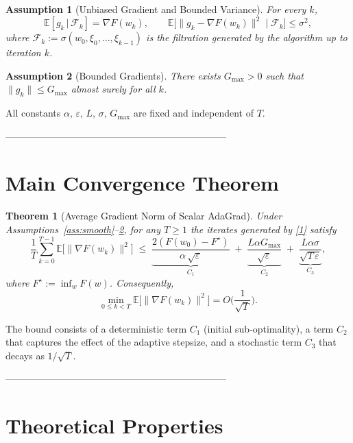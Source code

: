 \documentclass{article}
\newtheorem{theorem}{Theorem}
\newtheorem{assumption}{Assumption}
\newcommand{\E}{\mathbb{E}}
\begin{document}
\begin{assumption}[Unbiased Gradient and Bounded Variance]\label{ass:unbiased}
For every $k$,
\[
\E[g_k\,|\,\mathcal{F}_k]=\nabla F(w_k),\qquad 
\E\big[\|g_k-\nabla F(w_k)\|^2\;\big|\;\mathcal{F}_k\big]\le\sigma^2,
\]
where $\mathcal{F}_k:=\sigma(w_0,\xi_0,\dots,\xi_{k-1})$ is the filtration generated by the algorithm up to iteration $k$.
\end{assumption}

\begin{assumption}[Bounded Gradients]\label{ass:bound}
There exists $G_{\max}>0$ such that $\|g_k\|\le G_{\max}$ almost surely for all $k$.
\end{assumption}

All constants $\alpha,\,\varepsilon,\,L,\,\sigma,\,G_{\max}$ are fixed and independent of $T$.

---------------------------------------------------------------------

\section*{Main Convergence Theorem}

\begin{theorem}[Average Gradient Norm of Scalar AdaGrad]\label{thm:main}
Under Assumptions~\ref{ass:smooth}–\ref{ass:bound}, for any $T\ge 1$ the iterates generated by \eqref{1} satisfy
\[
\frac{1}{T}\sum_{k=0}^{T-1}\E\!\big[\|\nabla F(w_k)\|^2\big]
\;\le\;
\underbrace{\frac{2(F(w_0)-F^\star)}{\alpha\,\sqrt{\varepsilon}}}_{\displaystyle C_1}
\;+\;
\underbrace{\frac{L\alpha G_{\max}}{\sqrt{\varepsilon}}}_{\displaystyle C_2}
\;+\;
\underbrace{\frac{L\alpha\sigma}{\sqrt{T\,\varepsilon}}}_{\displaystyle C_3},
\tag{3}
\]
where $F^\star:=\inf_{w}F(w)$.  Consequently,
\[
\min_{0\le k<T}\E\!\big[\|\nabla F(w_k)\|^2\big]=O\!\Big(\frac{1}{\sqrt{T}}\Big).
\]
\end{theorem}

The bound consists of a deterministic term $C_1$ (initial sub‑optimality), a term $C_2$ that captures the effect of the adaptive stepsize, and a stochastic term $C_3$ that decays as $1/\sqrt{T}$.

---------------------------------------------------------------------

\section*{Theoretical Properties}
\end{document}
